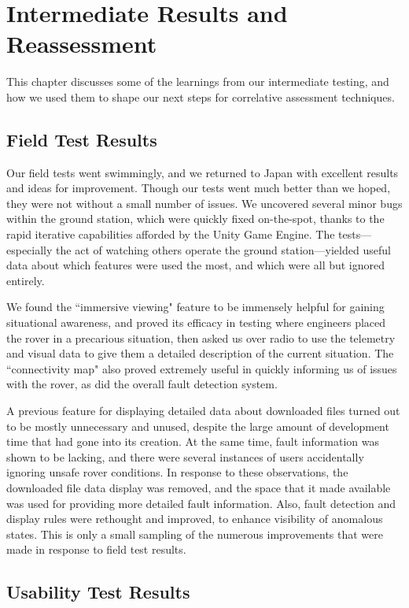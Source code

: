 \chapter{Intermediate Results and Reassessment}

This chapter discusses some of the learnings from our intermediate testing, and how we used them to shape our next steps for correlative assessment techniques.

\section{Field Test Results}

Our field tests went swimmingly, and we returned to Japan with excellent results and ideas for improvement. Though our tests went much better than we hoped, they were not without a small number of issues. We uncovered several minor bugs within the ground station, which were quickly fixed on-the-spot, thanks to the rapid iterative capabilities afforded by the Unity Game Engine. The tests---especially the act of watching others operate the ground station---yielded useful data about which features were used the most, and which were all but ignored entirely.

We found the ``immersive viewing" feature to be immensely helpful for gaining situational awareness, and proved its efficacy in testing where engineers placed the rover in a precarious situation, then asked us over radio to use the telemetry and visual data to give them a detailed description of the current situation. The ``connectivity map" also proved extremely useful in quickly informing us of issues with the rover, as did the overall fault detection system.

A previous feature for displaying detailed data about downloaded files turned out to be mostly unnecessary and unused, despite the large amount of development time that had gone into its creation. At the same time, fault information was shown to be lacking, and there were several instances of users accidentally ignoring unsafe rover conditions. In response to these observations, the downloaded file data display was removed, and the space that it made available was used for providing more detailed fault information. Also, fault detection and display rules were rethought and improved, to enhance visibility of anomalous states. This is only a small sampling of the numerous improvements that were made in response to field test results.

\section{Usability Test Results}

